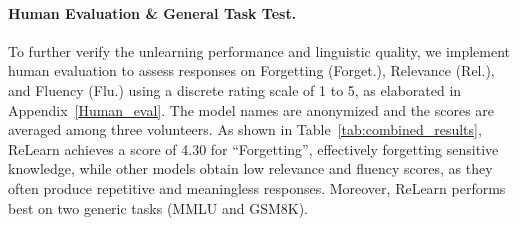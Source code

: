 \paragraph{Human Evaluation \& General Task Test.}
To further verify the unlearning performance and linguistic quality, we implement human evaluation to assess responses on Forgetting (Forget.), Relevance (Rel.), and Fluency (Flu.) using a discrete rating scale of 1 to 5, as elaborated in Appendix~\ref{Human_eval}. 
The model names are anonymized and the scores are averaged among three volunteers. 
As shown in Table~\ref{tab:combined_results}, ReLearn achieves a score of 4.30 for ``Forgetting'', effectively forgetting sensitive knowledge, while other models obtain low relevance and fluency scores, as they often produce repetitive and meaningless responses. 
Moreover, ReLearn performs best on two generic tasks (MMLU and GSM8K).

